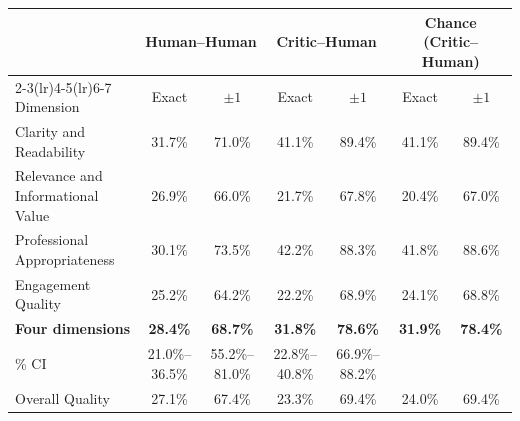 \begin{tabular}{lcccccc}
\toprule
 & \multicolumn{2}{c}{Human--Human} & \multicolumn{2}{c}{Critic--Human} & \multicolumn{2}{c}{Chance (Critic--Human)} \\
\cmidrule(lr){2-3}\cmidrule(lr){4-5}\cmidrule(lr){6-7}
Dimension & Exact & $\pm1$ & Exact & $\pm1$ & Exact & $\pm1$ \\
\midrule
Clarity and Readability & 31.7\% & 71.0\% & 41.1\% & 89.4\% & 41.1\% & 89.4\% \\
Relevance and Informational Value & 26.9\% & 66.0\% & 21.7\% & 67.8\% & 20.4\% & 67.0\% \\
Professional Appropriateness & 30.1\% & 73.5\% & 42.2\% & 88.3\% & 41.8\% & 88.6\% \\
Engagement Quality & 25.2\% & 64.2\% & 22.2\% & 68.9\% & 24.1\% & 68.8\% \\
\midrule
\textbf{Four dimensions} & \textbf{28.4\%} & \textbf{68.7\%} & \textbf{31.8\%} & \textbf{78.6\%} & \textbf{31.9\%} & \textbf{78.4\%} \\
\quad 95\% CI & 21.0\%--36.5\% & 55.2\%--81.0\% & 22.8\%--40.8\% & 66.9\%--88.2\% & & \\
\midrule
Overall Quality & 27.1\% & 67.4\% & 23.3\% & 69.4\% & 24.0\% & 69.4\% \\
\bottomrule
\end{tabular}
